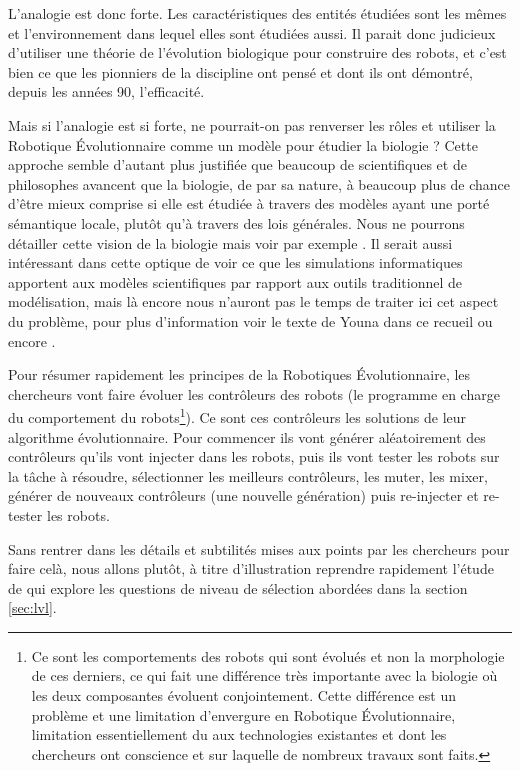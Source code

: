L'analogie est donc forte. Les caractéristiques des entités étudiées sont les mêmes et l'environnement dans lequel elles sont étudiées aussi. Il parait donc judicieux d'utiliser une théorie de l'évolution biologique pour construire des robots, et c'est bien ce que les pionniers de la discipline \citep{nolfi00evolrobobiolintetechselfmach} ont pensé et dont ils ont démontré, depuis les années 90, l'efficacité.

Mais si l'analogie est si forte, ne pourrait-on pas renverser les rôles et utiliser la Robotique \'Evolutionnaire comme un modèle pour étudier la biologie ? Cette approche semble d'autant plus justifiée que beaucoup de scientifiques et de philosophes avancent que la biologie, de par sa nature, à beaucoup plus de chance d'être mieux comprise si elle est étudiée à travers des modèles ayant une porté sémantique locale, plutôt qu'à travers des lois générales. Nous ne pourrons détailler cette vision de la biologie mais voir par exemple \cite{beatty1987onbehalfofsemanticview}. Il serait aussi intéressant dans cette optique de voir ce que les simulations informatiques apportent aux modèles scientifiques par rapport aux outils traditionnel de modélisation, mais là encore nous n'auront pas le temps de traiter ici cet aspect du problème, pour plus d'information voir le texte de Youna dans ce recueil ou encore \cite{winsberg03simulatedexperimentsmethodologyforavirtualworld}.

Pour résumer rapidement les principes de la Robotiques \'Evolutionnaire, les chercheurs vont faire évoluer les contrôleurs des robots (le programme en charge du comportement du robots\footnote{Ce sont les comportements des robots qui sont évolués et non la morphologie de ces derniers, ce qui fait une différence très importante avec la biologie où les deux composantes évoluent conjointement. Cette différence est un problème et une limitation d'envergure en Robotique \'Evolutionnaire, limitation essentiellement du aux technologies existantes et dont les chercheurs ont conscience et sur laquelle de nombreux travaux sont faits\citep{pollack2000thegolemproject}.}). Ce sont ces contrôleurs les solutions de leur algorithme évolutionnaire. Pour commencer ils vont générer aléatoirement des contrôleurs qu'ils vont injecter dans les robots, puis ils vont tester les robots sur la tâche à résoudre, sélectionner les meilleurs contrôleurs, les muter, les mixer, générer de nouveaux contrôleurs (une nouvelle génération) puis re-injecter et re-tester les robots. 

Sans rentrer dans les détails et subtilités mises aux points par les chercheurs pour faire celà, nous allons plutôt, à titre d'illustration reprendre rapidement l'étude de \cite{waibel09geneticteamcompositionlevelselectionevolutioncooperation} qui explore les questions de niveau de sélection abordées dans la section \ref{sec:lvl}.


